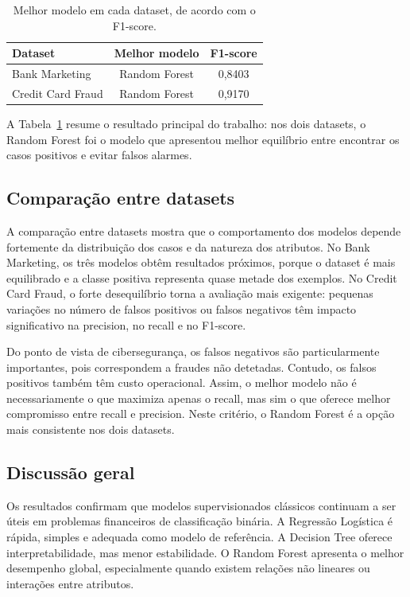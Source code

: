 \documentclass[10pt,twocolumn]{article}
\begin{document}
\begin{table}[H]
\centering
\caption{Melhor modelo em cada dataset, de acordo com o F1-score.}
\label{tab:bestmodels}
\begin{tabular}{lcc}
\toprule
Dataset & Melhor modelo & F1-score \\
\midrule
Bank Marketing & Random Forest & 0,8403 \\
Credit Card Fraud & Random Forest & 0,9170 \\
\bottomrule
\end{tabular}
\end{table}

A Tabela~\ref{tab:bestmodels} resume o resultado principal do trabalho: nos dois datasets, o Random Forest foi o modelo que apresentou melhor equilíbrio entre encontrar os casos positivos e evitar falsos alarmes.

\subsection{Comparação entre datasets}
A comparação entre datasets mostra que o comportamento dos modelos depende fortemente da distribuição dos casos e da natureza dos atributos. No Bank Marketing, os três modelos obtêm resultados próximos, porque o dataset é mais equilibrado e a classe positiva representa quase metade dos exemplos. No Credit Card Fraud, o forte desequilíbrio torna a avaliação mais exigente: pequenas variações no número de falsos positivos ou falsos negativos têm impacto significativo na precision, no recall e no F1-score.

Do ponto de vista de cibersegurança, os falsos negativos são particularmente importantes, pois correspondem a fraudes não detetadas. Contudo, os falsos positivos também têm custo operacional. Assim, o melhor modelo não é necessariamente o que maximiza apenas o recall, mas sim o que oferece melhor compromisso entre recall e precision. Neste critério, o Random Forest é a opção mais consistente nos dois datasets.

\subsection{Discussão geral}
Os resultados confirmam que modelos supervisionados clássicos continuam a ser úteis em problemas financeiros de classificação binária. A Regressão Logística é rápida, simples e adequada como modelo de referência. A Decision Tree oferece interpretabilidade, mas menor estabilidade. O Random Forest apresenta o melhor desempenho global, especialmente quando existem relações não lineares ou interações entre atributos.
\end{document}
